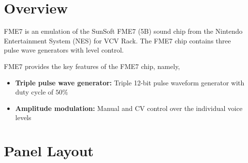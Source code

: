 \documentclass[12pt,letter]{article}
\begin{document}


\section{Overview}

FME7 is an emulation of the SunSoft FME7 (5B) sound chip from the Nintendo Entertainment System (NES) for VCV Rack. The FME7 chip contains three pulse wave generators with level control.

FME7 provides the key features of the FME7 chip, namely,
\begin{itemize}
  \item \textbf{Triple pulse wave generator:} Triple 12-bit pulse waveform generator with duty cycle of $50\%$
  \item \textbf{Amplitude modulation:} Manual and CV control over the individual voice levels
\end{itemize}


\clearpage
\section{Panel Layout}
\end{document}
